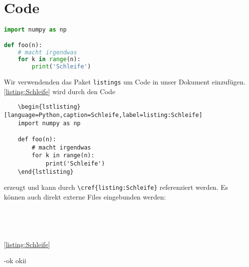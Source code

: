 \section{Code}
\begin{lstlisting}[language=Python,caption=Schleife,label=listing:Schleife]
import numpy as np

def foo(n):
    # macht irgendwas
    for k in range(n):
        print('Schleife')
\end{lstlisting}
Wir verwendenden das Paket \verb|listings| um Code in unser Dokument einzufügen.
\cref{listing:Schleife} wird durch den Code
\begin{verbatim}
    \begin{lstlisting}[language=Python,caption=Schleife,label=listing:Schleife]
    import numpy as np
    
    def foo(n):
        # macht irgendwas
        for k in range(n):
            print('Schleife')
    \end{lstlisting}
\end{verbatim}
erzeugt und kann durch \verb|\cref{listing:Schleife}| referenziert werden. Es können auch direkt externe Files eingebunden werden:
\begin{verbatim}
    
\end{verbatim}




 \\

\clearpage


\cref{listing:Schleife}


\begin{satz}{-}{ok}
okii
\end{satz}

